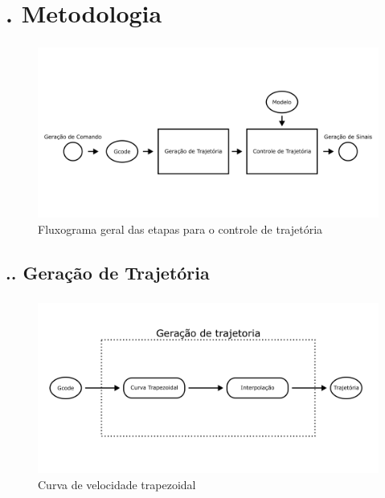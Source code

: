\documentclass[aspectratio=169]{beamer}
\begin{document}
\section{\insertsectionnumber . Metodologia}
\begin{frame}
  \frametitle{\insertsection}
  \begin{figure}[H]
    \centering
    \caption{Fluxograma geral das etapas para o controle de trajetória}
    \includegraphics[width=.9\textwidth]{fluxo_geral}
  
    \label{fig:fluxo_geral}
  \end{figure}
\end{frame}

\subsection{\insertsectionnumber .\insertsubsectionnumber . Geração de Trajetória}

\begin{frame}
  \frametitle{\insertsubsection}
  \begin{figure}[H]
    \centering
    \caption{Curva de velocidade trapezoidal}
    \includegraphics[width=.9\textwidth]{geracao_de_trajetoria}

    \label{fig:geracao_de_trajetoria}
  \end{figure}
\end{frame}
\end{document}
